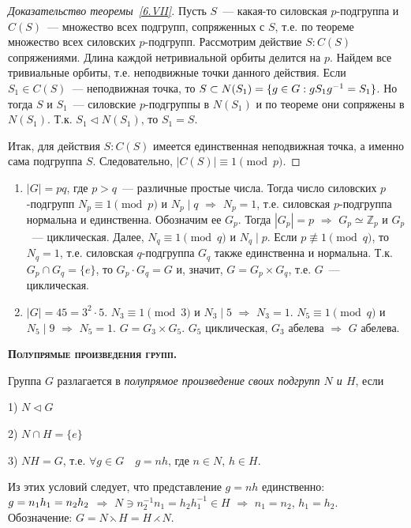 \documentclass[a4paper]{article}
\newcommand*{\tema}[1]{\vspace{20pt}
\begin{center}{\textbf{\textsc{#1.}}}\vspace{5pt}
\end{center}}
\newcommand*{\p}[1]{#1\nobreak\discretionary{}{\hbox{$\mathsurround=0pt #1$}}{}}
\begin{document}
\begin{proof}[Доказательство теоремы~\ref{6.VII}]
Пусть $S$~--- какая-то силовская $p$-подгруппа и $C(S)$~---
множество всех подгрупп, сопряженных с $S$, т.е. по теореме
множество всех силовских $p$-подгрупп. Рассмотрим действие $S:C(S)$
сопряжениями. Длина каждой нетривиальной орбиты делится на $p$.
Найдем все тривиальные орбиты, т.е. неподвижные точки данного
действия. Если $S_1\in C(S)$~--- неподвижная точка, то $S\subset
N(S_1)=\{g\in G:gS_1g^{-1}\p=S_1\}$. Но тогда $S$ и $S_1$~---
силовские $p$-подгруппы в $N(S_1)$ и по теореме они сопряжены в
$N(S_1)$. Т.к. $S_1\triangleleft N(S_1)$, то $S_1=S$.

Итак, для действия $S:C(S)$ имеется единственная неподвижная точка,
а именно сама подгруппа $S$. Следовательно, $|C(S)|\equiv1\pmod{p}$.
\end{proof}

\begin{ex}
\begin{enumerate}
  \item $|G|=pq$, где $p>q$~--- различные простые числа. Тогда число
  силовских $p$-подгрупп $N_p\equiv1\pmod{p}$ и $N_p\mid q$
  $\Rightarrow$ $N_p=1$, т.е. силовская $p$-подгруппа нормальна и
  единственна. Обозначим ее $G_p$. Тогда $|G_p|=p$ $\Rightarrow$ $G_p\simeq
  \mathbb{Z}_p$ и $G_p$~--- циклическая. Далее, $N_q\equiv1\pmod{q}$
  и $N_q\mid p$. Если $p\not\equiv1\pmod{q}$, то $N_q=1$, т.е.
  силовская $q$-подгруппа $G_q$ также единственна и нормальна. Т.к.
  $G_p\cap G_q=\{e\}$, то $G_p\cdot G_q=G$ и, значит, $G=G_p\times
  G_q$, т.е. $G$~--- циклическая.
  \item $|G|=45=3^2\cdot5$. $N_3\equiv1\pmod{3}$ и $N_3\mid 5$
  $\Rightarrow$ $N_3=1$. $N_5\equiv1\pmod{q}$ и $N_5\mid 9$
  $\Rightarrow$ $N_5=1$. $G=G_3\times G_5$. $G_5$ циклическая, $G_3$
  абелева $\Rightarrow$ $G$ абелева.
\end{enumerate}
\end{ex}
\tema{Полупрямые произведения групп}

Группа $G$ разлагается в \emph{полупрямое произведение своих
подгрупп $N$ и $H$}, если

1) $N\triangleleft G$

2) $N\cap H=\{e\}$

3) $NH=G$, т.е. $\forall g\in G\quad g=nh$, где $n\in N$, $h\in H$.

Из этих условий следует, что представление $g=nh$ единственно:
$g\p=n_1h_1=n_2h_2$ $\Rightarrow$ $N\ni n_2^{-1}n_1=h_2h_1^{-1}\in
H$ $\Rightarrow$ $n_1=n_2$, $h_1=h_2$. Обозначение:
$G=N\leftthreetimes H=H\rightthreetimes N$.
\end{document}
